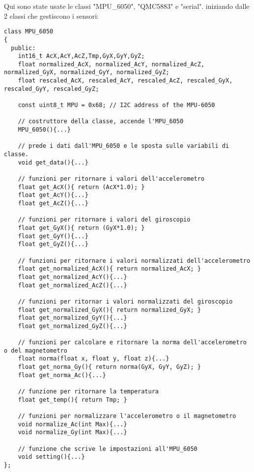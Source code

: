 \documentclass[10pt,a4paper]{article}
\begin{document}
Qui sono state usate le classi "MPU\_6050", "QMC5883" e "serial".
iniziando dalle 2 classi che gestiscono i sensori:
\begin{lstlisting}[style=myArduino, caption=classe "MPU\_6050", captionpos=b]
class MPU_6050
{
  public:
    int16_t AcX,AcY,AcZ,Tmp,GyX,GyY,GyZ;
    float normalized_AcX, normalized_AcY, normalized_AcZ, normalized_GyX, normalized_GyY, normalized_GyZ;
    float rescaled_AcX, rescaled_AcY, rescaled_AcZ, rescaled_GyX, rescaled_GyY, rescaled_GyZ;
  
    const uint8_t MPU = 0x68; // I2C address of the MPU-6050
    
    // costruttore della classe, accende l'MPU_6050
    MPU_6050(){...}
  
    // prede i dati dall'MPU_6050 e le sposta sulle variabili di classe.
    void get_data(){...}
  
    // funzioni per ritornare i valori dell'accelerometro
    float get_AcX(){ return (AcX*1.0); }
    float get_AcY(){...}
    float get_AcZ(){...}
  
    // funzioni per ritornare i valori del giroscopio
    float get_GyX(){ return (GyX*1.0); }
    float get_GyY(){...}
    float get_GyZ(){...}
    
    // funzioni per ritornare i valori normalizzati dell'accelerometro
    float get_normalized_AcX(){ return normalized_AcX; }
    float get_normalized_AcY(){...}
    float get_normalized_AcZ(){...}
  
    // funzioni per ritornar i valori normalizzati del giroscopio
    float get_normalized_GyX(){ return normalized_GyX; }
    float get_normalized_GyY(){...}
    float get_normalized_GyZ(){...}
  
    // funzioni per calcolare e ritornare la norma dell'accelerometro o del magnetometro
    float norma(float x, float y, float z){...}
    float get_norma_Gy(){ return norma(GyX, GyY, GyZ); }
    float get_norma_Ac(){...}
  
    // funzione per ritornare la temperatura
    float get_temp(){ return Tmp; }
  
    // funzioni per normalizzare l'accelerometro o il magnetometro
    void normalize_Ac(int Max){...}
    void normalize_Gy(int Max){...}
    
    // funzione che scrive le impostazioni all'MPU_6050
    void setting(){...}
};
\end{lstlisting}
\end{document}
